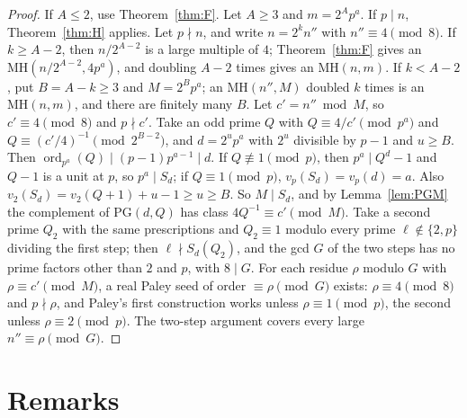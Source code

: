 \documentclass[10pt]{article}
\theoremstyle{remark}
\newcommand{\MH}{\mathrm{MH}}
\newcommand{\ord}{\operatorname{ord}}
\newcommand{\PG}{\mathrm{PG}}
\begin{document}
\begin{proof}
If $A\le2$, use Theorem~\ref{thm:F}. Let $A\ge3$ and $m=2^Ap^a$. If $p\mid n$, Theorem~\ref{thm:H} applies. Let $p\nmid n$, and write $n=2^kn''$ with $n''\equiv4\pmod8$. If $k\ge A-2$, then $n/2^{A-2}$ is a large multiple of $4$; Theorem~\ref{thm:F} gives an $\MH(n/2^{A-2},4p^a)$, and doubling $A-2$ times gives an $\MH(n,m)$. If $k<A-2$, put $B=A-k\ge3$ and $M=2^Bp^a$; an $\MH(n'',M)$ doubled $k$ times is an $\MH(n,m)$, and there are finitely many $B$. Let $c'=n''\bmod M$, so $c'\equiv4\pmod8$ and $p\nmid c'$. Take an odd prime $Q$ with $Q\equiv4/c'\pmod{p^a}$ and $Q\equiv(c'/4)^{-1}\pmod{2^{B-2}}$, and $d=2^up^a$ with $2^u$ divisible by $p-1$ and $u\ge B$. Then $\ord_{p^a}(Q)\mid(p-1)p^{a-1}\mid d$. If $Q\not\equiv1\pmod p$, then $p^a\mid Q^d-1$ and $Q-1$ is a unit at $p$, so $p^a\mid S_d$; if $Q\equiv1\pmod p$, $v_p(S_d)=v_p(d)=a$. Also $v_2(S_d)=v_2(Q+1)+u-1\ge u\ge B$. So $M\mid S_d$, and by Lemma~\ref{lem:PGM} the complement of $\PG(d,Q)$ has class $4Q^{-1}\equiv c'\pmod M$. Take a second prime $Q_2$ with the same prescriptions and $Q_2\equiv1$ modulo every prime $\ell\notin\{2,p\}$ dividing the first step; then $\ell\nmid S_d(Q_2)$, and the gcd $G$ of the two steps has no prime factors other than $2$ and $p$, with $8\mid G$. For each residue $\rho$ modulo $G$ with $\rho\equiv c'\pmod M$, a real Paley seed of order $\equiv\rho\pmod G$ exists: $\rho\equiv4\pmod 8$ and $p\nmid\rho$, and Paley's first construction works unless $\rho\equiv1\pmod p$, the second unless $\rho\equiv2\pmod p$. The two-step argument covers every large $n''\equiv\rho\pmod G$.
\end{proof}

\section{Remarks}\label{sec:remarks}
\end{document}
